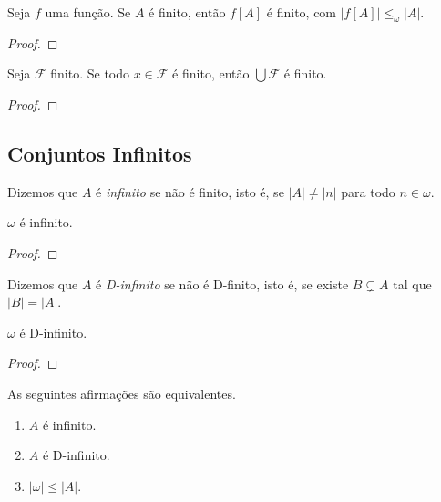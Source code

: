 \begin{proposition} 
    Seja $f$ uma função. Se $A$ é finito, então $f[A]$ é finito, com $|f[A]| \leq_{\omega} |A|$.
\end{proposition}

\begin{proof}
    \blackproof
\end{proof}

\begin{proposition} 
    Seja $\mathcal{F}$ finito. Se todo $x \in \mathcal{F}$ é finito, então $\bigcup \mathcal{F}$ é finito.
\end{proposition}

\begin{proof}
    \blackproof
\end{proof}

\subsection{Conjuntos Infinitos}

\begin{definition}
    Dizemos que $A$ é \emph{infinito} se não é finito, isto é, se $|A| \neq |n|$ para todo $n \in \omega$.
\end{definition}

\begin{corollary}
    $\omega$ é infinito.
\end{corollary}

\begin{proof}
    \blackproof
\end{proof}

\begin{definition}
    Dizemos que $A$ é \emph{D-infinito} se não é D-finito, isto é, se existe $B \subsetneq A$ tal que $|B| = |A|$.
\end{definition}

\begin{corollary}
    $\omega$ é D-infinito.
\end{corollary}

\begin{proof}
    \blackproof
\end{proof}

\begin{theorem} 
    As seguintes afirmações são equivalentes.
        \begin{enumerate}[label=\roman*.]
            \item $A$ é infinito.
            \item $A$ é D-infinito.
            \item $|\omega| \leq |A|$.
        \end{enumerate}
\end{theorem}

